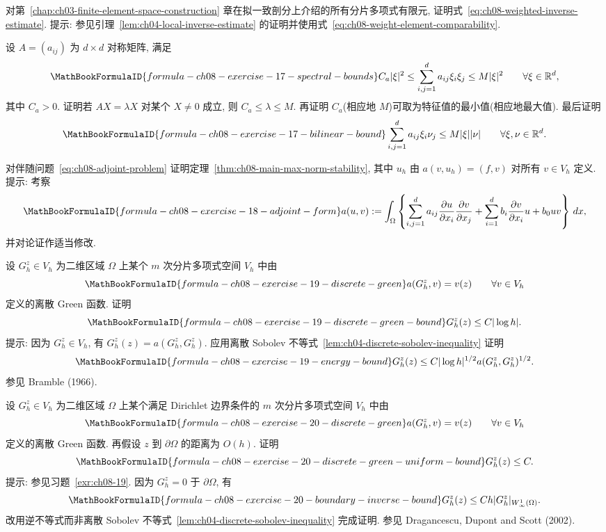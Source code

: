 \begin{MBExercise}
\label{exr:ch08-16}
对第~\ref{chap:ch03-finite-element-space-construction} 章在拟一致剖分上介绍的所有分片多项式有限元, 证明式~\eqref{eq:ch08-weighted-inverse-estimate}. 提示: 参见引理~\ref{lem:ch04-local-inverse-estimate} 的证明并使用式~\eqref{eq:ch08-weight-element-comparability}.
\end{MBExercise}

\begin{MBExercise}
\label{exr:ch08-17}
设 $A=(a_{ij})$ 为 $d\times d$ 对称矩阵, 满足
\[
\MathBookFormulaID{formula-ch08-exercise-17-spectral-bounds}
C_a|\xi|^2\leq\sum_{i,j=1}^{d}a_{ij}\xi_i\xi_j\leq M|\xi|^2
\qquad\forall\xi\in\mathbb R^d,
\]
其中 $C_a>0$. 证明若 $AX=\lambda X$ 对某个 $X\neq0$ 成立, 则 $C_a\leq\lambda\leq M$. 再证明 $C_a$(相应地 $M$)可取为特征值的最小值(相应地最大值). 最后证明
\[
\MathBookFormulaID{formula-ch08-exercise-17-bilinear-bound}
\sum_{i,j=1}^{d}a_{ij}\xi_i\nu_j\leq M|\xi||\nu|
\qquad\forall\xi,\nu\in\mathbb R^d.
\]
\end{MBExercise}

\begin{MBExercise}
\label{exr:ch08-18}
对伴随问题~\eqref{eq:ch08-adjoint-problem} 证明定理~\ref{thm:ch08-main-max-norm-stability}, 其中 $u_h$ 由 $a(v,u_h)=(f,v)$ 对所有 $v\in V_h$ 定义. 提示: 考察
\[
\MathBookFormulaID{formula-ch08-exercise-18-adjoint-form}
a(u,v):=\int_\Omega\left\{\sum_{i,j=1}^{d}a_{ij}
\frac{\partial u}{\partial x_i}\frac{\partial v}{\partial x_j}
+\sum_{i=1}^{d}b_i\frac{\partial v}{\partial x_i}u+b_0uv\right\}\,dx,
\]
并对论证作适当修改.
\end{MBExercise}

\begin{MBExercise}
\label{exr:ch08-19}
设 $G_h^z\in V_h$ 为二维区域 $\Omega$ 上某个 $m$ 次分片多项式空间 $V_h$ 中由
\[
\MathBookFormulaID{formula-ch08-exercise-19-discrete-green}
a(G_h^z,v)=v(z)
\qquad\forall v\in V_h
\]
定义的离散 Green 函数. 证明
\[
\MathBookFormulaID{formula-ch08-exercise-19-discrete-green-bound}
G_h^z(z)\leq C|\log h|.
\]
提示: 因为 $G_h^z\in V_h$, 有 $G_h^z(z)=a(G_h^z,G_h^z)$. 应用离散 Sobolev 不等式~\ref{lem:ch04-discrete-sobolev-inequality} 证明
\[
\MathBookFormulaID{formula-ch08-exercise-19-energy-bound}
G_h^z(z)\leq C|\log h|^{1/2}a(G_h^z,G_h^z)^{1/2}.
\]
参见 Bramble (1966).
\end{MBExercise}

\begin{MBExercise}
\label{exr:ch08-20}
设 $G_h^z\in V_h$ 为二维区域 $\Omega$ 上某个满足 Dirichlet 边界条件的 $m$ 次分片多项式空间 $V_h$ 中由
\[
\MathBookFormulaID{formula-ch08-exercise-20-discrete-green}
a(G_h^z,v)=v(z)
\qquad\forall v\in V_h
\]
定义的离散 Green 函数. 再假设 $z$ 到 $\partial\Omega$ 的距离为 $O(h)$. 证明
\[
\MathBookFormulaID{formula-ch08-exercise-20-discrete-green-uniform-bound}
G_h^z(z)\leq C.
\]
提示: 参见习题~\ref{exr:ch08-19}. 因为 $G_h^z=0$ 于 $\partial\Omega$, 有
\[
\MathBookFormulaID{formula-ch08-exercise-20-boundary-inverse-bound}
G_h^z(z)\leq Ch|G_h^z|_{W_\infty^1(\Omega)}.
\]
改用逆不等式而非离散 Sobolev 不等式~\ref{lem:ch04-discrete-sobolev-inequality} 完成证明. 参见 Dragancescu, Dupont and Scott (2002).
\end{MBExercise}
